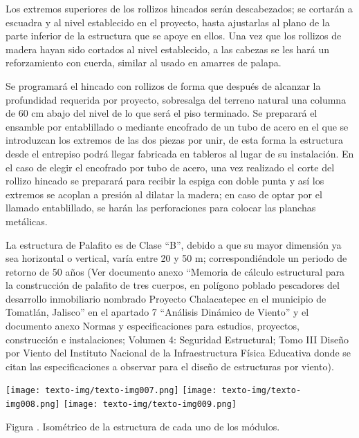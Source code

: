 \documentclass{article}
\newcounter{Figura}
\renewcommand\theFigura{\arabic{Figura}}
\begin{document}
\bigskip

Los extremos superiores de los rollizos hincados serán descabezados; se cortarán a escuadra y al nivel establecido en el proyecto, hasta ajustarlas al plano de la parte inferior de la estructura que se apoye en ellos. Una vez que los rollizos de madera hayan sido cortados al nivel establecido, a las cabezas se les hará un reforzamiento con cuerda, similar al usado en amarres de palapa.


\bigskip

Se programará el hincado con rollizos de forma que después de alcanzar la profundidad requerida por proyecto, sobresalga del terreno natural una columna de 60 cm abajo del nivel de lo que será el piso terminado. Se preparará el ensamble por entablillado o mediante encofrado de un tubo de acero en el que se introduzcan los extremos de las dos piezas por unir, de esta forma la estructura desde el entrepiso podrá llegar fabricada en tableros al lugar de su instalación. En el caso de elegir el encofrado por tubo de acero, una vez realizado el corte del rollizo hincado se preparará para recibir la espiga con doble punta y así los extremos se acoplan a presión al dilatar la madera; en caso de optar por el llamado entablillado, se harán las perforaciones para colocar las planchas metálicas.


\bigskip

La estructura de Palafito es de Clase “B”, debido a que su mayor dimensión ya sea horizontal o vertical, varía entre 20 y 50 m; correspondiéndole un periodo de retorno de 50 años (Ver documento anexo “Memoria de cálculo estructural para la construcción de palafito de tres cuerpos, en polígono poblado pescadores del desarrollo inmobiliario nombrado Proyecto Chalacatepec en el municipio de Tomatlán, Jalisco” en el apartado 7 “Análisis Dinámico de Viento” y el documento anexo Normas y especificaciones para estudios, proyectos, construcción e instalaciones; Volumen 4: Seguridad Estructural; Tomo III Diseño por Viento del Instituto Nacional de la Infraestructura Física Educativa donde se citan las especificaciones a observar para el diseño de estructuras por viento).

 \texttt{[image: texto-img/texto-img007.png]}  \texttt{[image: texto-img/texto-img008.png]}  \texttt{[image: texto-img/texto-img009.png]} 

Figura \stepcounter{Figura}{\theFigura}. Isométrico de la estructura de cada uno de los módulos.


\bigskip
\end{document}
